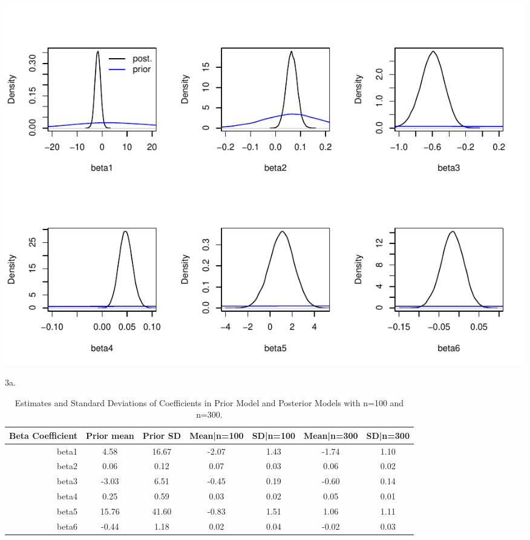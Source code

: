 \documentclass[
]{article}
\begin{document}
\includegraphics{Lab-3-Markdown_files/figure-latex/unnamed-chunk-5-1.pdf}

3a.

\begin{table}[h]

\begin{center}
\begin{threeparttable}

\caption{\label{tab:unnamed-chunk-6}Estimates and Standard Deviations of Coefficients in Prior Model and Posterior Models with n=100 and n=300.}

\begin{tabular}{rcccccc}
\toprule
Beta Coefficient & Prior mean & Prior SD & Mean|n=100 & SD|n=100 & Mean|n=300 & SD|n=300\\
\midrule
beta1 & 4.58 & 16.67 & -2.07 & 1.43 & -1.74 & 1.10\\
beta2 & 0.06 & 0.12 & 0.07 & 0.03 & 0.06 & 0.02\\
beta3 & -3.03 & 6.51 & -0.45 & 0.19 & -0.60 & 0.14\\
beta4 & 0.25 & 0.59 & 0.03 & 0.02 & 0.05 & 0.01\\
beta5 & 15.76 & 41.60 & -0.83 & 1.51 & 1.06 & 1.11\\
beta6 & -0.44 & 1.18 & 0.02 & 0.04 & -0.02 & 0.03\\
\bottomrule
\end{tabular}

\end{threeparttable}
\end{center}

\end{table}

\newpage
\end{document}
